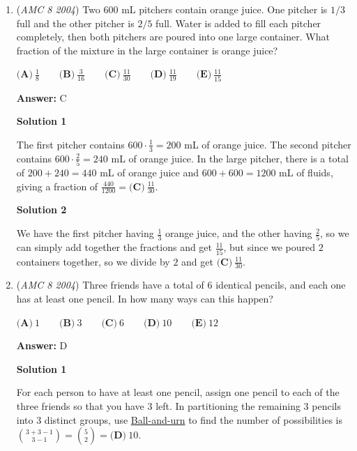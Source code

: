 \begin{enumerate}
 


	\item (\textit{AMC 8 2004}) Two $600$ mL pitchers contain orange juice. One pitcher is $1/3$ full and the other pitcher is $2/5$ full. Water is added to fill each pitcher completely, then both pitchers are poured into one large container. What fraction of the mixture in the large container is orange juice?


 $\textbf{(A)}\ \frac18 \qquad \textbf{(B)}\ \frac{3}{16} \qquad \textbf{(C)}\ \frac{11}{30} \qquad \textbf{(D)}\ \frac{11}{19}\qquad \textbf{(E)}\ \frac{11}{15}$

 \textbf{Answer: }C



\textbf{Solution 1}

The first pitcher contains $600 \cdot \frac13 = 200$ mL of orange juice. The second pitcher contains $600 \cdot \frac25 = 240$ mL of orange juice. In the large pitcher, there is a total of $200+240=440$ mL of orange juice and $600+600=1200$ mL of fluids, giving a fraction of $\frac{440}{1200} = \boxed{\textbf{(C)}\ \frac{11}{30}}$.

 



\textbf{Solution 2}

We have the first pitcher having $\frac13$ orange juice, and the other having $\frac25$, so we can simply add together the fractions and get $\frac{11}{15}$, but since we poured $2$ containers together, so we divide by $2$ and get $\boxed{\textbf{(C)}\ \frac{11}{30}}$.

 


	\item (\textit{AMC 8 2004}) Three friends have a total of $6$ identical pencils, and each one has at least one pencil. In how many ways can this happen?


 $\textbf{(A)}\ 1\qquad \textbf{(B)}\ 3\qquad \textbf{(C)}\ 6\qquad \textbf{(D)}\ 10 \qquad \textbf{(E)}\ 12$

 \textbf{Answer: }D



\textbf{Solution 1}

For each person to have at least one pencil, assign one pencil to each of the three friends so that you have $3$ left. In partitioning the remaining $3$ pencils into $3$ distinct groups, use \href{https://artofproblemsolving.com/wiki/index.php?title=Ball-and-urn}{Ball-and-urn} to find the number of possibilities is $\binom{3+3-1}{3-1} = \binom{5}{2} = \boxed{\textbf{(D)}\ 10}$.


\end{enumerate}
